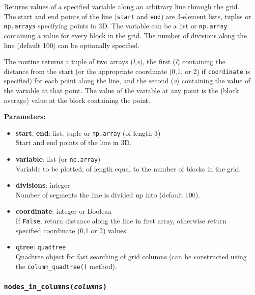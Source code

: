 Returns values of a specified variable along an arbitrary line through the grid.  The start and end points of the line (\texttt{start} and \texttt{end}) are 3-element lists, tuples or \texttt{np.arrays} specifying points in 3D.  The variable can be a list or \texttt{np.array} containing a value for every block in the grid.  The number of divisions along the line (default 100) can be optionally specified.

The routine returns a tuple of two arrays (\emph{l},\emph{v}), the first (\emph{l}) containing the distance from the start (or the appropriate coordinate (0,1, or 2) if \texttt{coordinate} is specified) for each point along the line, and the second (\emph{v}) containing the value of the variable at that point.  The value of the variable at any point is the (block average) value at the block containing the point.


\textbf{Parameters:}
\begin{itemize}
\item \textbf{start}, \textbf{end}: list, tuple or \texttt{np.array} (of length 3)\\
  Start and end points of the line in 3D.
\item \textbf{variable}: list (or \texttt{np.array})\\
  Variable to be plotted, of length equal to the number of blocks in the grid.
\item \textbf{divisions}: integer\\
  Number of segments the line is divided up into (default 100).
\item \textbf{coordinate}: integer or Boolean\\
  If \texttt{False}, return distance along the line in first array, otherwise return specified coordinate (0,1 or 2) values.
\item \textbf{qtree}: \texttt{quadtree}\\
  Quadtree object for fast searching of grid columns (can be constructed using the \texttt{column\_quadtree()} method).
\end{itemize}

\begin{snugshade}\subsubsection{\texttt{nodes\_in\_columns(\emph{columns})}}\end{snugshade}
\label{sec:mulgrid:nodes_in_columns}

